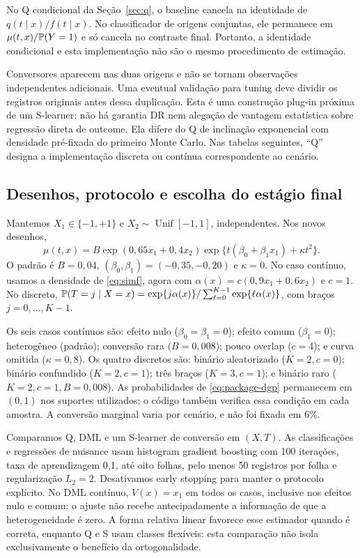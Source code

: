 No Q condicional da Seção~\ref{sec:q}, o baseline cancela na identidade de $q(t\mid x)/f(t\mid x)$. No classificador de origens conjuntas, ele permanece em $\mu(t,x)/\mathbb P(Y=1)$ e só cancela no contraste final. Portanto, a identidade condicional e esta implementação não são o mesmo procedimento de estimação.

Conversores aparecem nas duas origens e não se tornam observações independentes adicionais. Uma eventual validação para tuning deve dividir os registros originais antes dessa duplicação. Esta é uma construção plug-in próxima de um S-learner: não há garantia DR nem alegação de vantagem estatística sobre regressão direta de outcome. Ela difere do Q de inclinação exponencial com densidade pré-fixada do primeiro Monte Carlo. Nas tabelas seguintes, ``Q'' designa a implementação discreta ou contínua correspondente ao cenário.

\subsection{Desenhos, protocolo e escolha do estágio final}
Mantemos $X_1\in\{-1,+1\}$ e $X_2\sim\operatorname{Unif}[-1,1]$, independentes. Nos novos desenhos,
\begin{equation}
\mu(t,x)=B\exp(0{,}65x_1+0{,}4x_2)
\exp\{t(\beta_0+\beta_1x_1)+\kappa t^2\}.
\label{eq:package-dgp}
\end{equation}
O padrão é $B=0{,}04$, $(\beta_0,\beta_1)=(-0{,}35,-0{,}20)$ e $\kappa=0$. No caso contínuo, usamos a densidade de \eqref{eq:simf}, agora com $\alpha(x)=c(0{,}9x_1+0{,}6x_2)$ e $c=1$. No discreto, $\mathbb P(T=j\mid X=x)=\exp\{j\alpha(x)\}/\sum_{\ell=0}^{K-1}\exp\{\ell\alpha(x)\}$, com braços $j=0,\ldots,K-1$.

Os seis casos contínuos são: efeito nulo ($\beta_0=\beta_1=0$); efeito comum ($\beta_1=0$); heterogêneo (padrão); conversão rara ($B=0{,}008$); pouco overlap ($c=4$); e curva omitida ($\kappa=0{,}8$). Os quatro discretos são: binário aleatorizado ($K=2,c=0$); binário confundido ($K=2,c=1$); três braços ($K=3,c=1$); e binário raro ($K=2,c=1,B=0{,}008$). As probabilidades de \eqref{eq:package-dgp} permanecem em $(0,1)$ nos suportes utilizados; o código também verifica essa condição em cada amostra. A conversão marginal varia por cenário, e não foi fixada em 6\%.

Comparamos Q, DML e um S-learner de conversão em $(X,T)$. As classificações e regressões de nuisance usam histogram gradient boosting com 100 iterações, taxa de aprendizagem 0,1, até oito folhas, pelo menos 50 registros por folha e regularização $L_2=2$. Desativamos early stopping para manter o protocolo explícito. No DML contínuo, $V(x)=x_1$ em todos os casos, inclusive nos efeitos nulo e comum; o ajuste não recebe antecipadamente a informação de que a heterogeneidade é zero. A forma relativa linear favorece esse estimador quando é correta, enquanto Q e S usam classes flexíveis: esta comparação não isola exclusivamente o benefício da ortogonalidade.


